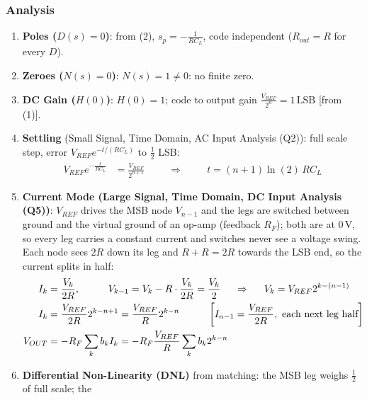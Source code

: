 \subsubsection{Analysis}
\begin{enumerate}
  \item \textbf{Poles (\(D(s) = 0\))}: from (2), \(s_p = -\frac{1}{R C_L}\), code independent (\(R_{out} = R\) for every \(D\)).
  \item \textbf{Zeroes (\(N(s) = 0\))}: \(N(s) = 1 \neq 0\): no finite zero.
  \item \textbf{DC Gain (\(H(0)\))}: \(H(0) = 1\); code to output gain \(\frac{V_{REF}}{2^n} = 1\,\text{LSB}\) [from (1)].
  \item \textbf{Settling} (Small Signal, Time Domain, AC Input Analysis (Q2)): full scale step, error
    \(V_{REF}e^{-t/(RC_L)}\) to \(\frac{1}{2}\) LSB:
    \begin{align*}
      V_{REF} e^{-\frac{t}{RC_L}} &= \frac{V_{REF}}{2^{n+1}} \hspace{1cm} \Rightarrow \hspace{1cm} t = (n + 1)\ln(2)\, R C_L
    \end{align*}
  \item \textbf{Current Mode (Large Signal, Time Domain, DC Input Analysis (Q5))}:
    \(V_{REF}\) drives the MSB node \(V_{n-1}\) and the legs are switched between
    ground and the virtual ground of an op-amp (feedback \(R_F\)); both are at
    0\,V, so every leg carries a constant current and switches never see a
    voltage swing. Each node sees \(2R\) down its leg and \(R + R = 2R\)
    towards the LSB end, so the current splits in half:
    \begin{align*}
      I_k &= \frac{V_k}{2R}, \hspace{1cm} V_{k-1} = V_k - R \cdot \frac{V_k}{2R} = \frac{V_k}{2}
      \hspace{0.5cm} \Rightarrow \hspace{0.5cm} V_k = V_{REF} 2^{k - (n-1)} \\
      I_k &= \frac{V_{REF}}{2R} 2^{k-n+1} = \frac{V_{REF}}{R} 2^{k-n}
      \hspace{1cm} \left[I_{n-1} = \frac{V_{REF}}{2R}, \text{ each next leg half}\right] \\
      V_{OUT} &= -R_F \sum_{k} b_k I_k = -R_F \frac{V_{REF}}{R} \sum_{k} b_k 2^{k-n}
    \end{align*}
  \item \textbf{Differential Non-Linearity (DNL)} from matching: the MSB leg weighs \(\frac{1}{2}\) of full scale; the

\end{enumerate}
